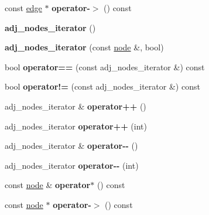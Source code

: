 \begin{DoxyCompactItemize}
\mbox{\label{classnode_a71b168f27cc7338906814f6a3ecc176f}} 
const \mbox{\hyperlink{classedge}{edge}} $\ast$ {\bfseries operator-\/$>$} () const
\item 
\mbox{\label{classnode_a392f19ea6dfa344bdf5c4d5a4b25eb8c}} 
{\bfseries adj\+\_\+nodes\+\_\+iterator} ()
\item 
\mbox{\label{classnode_ade9ca1b2c63a0467be176756545b3c2c}} 
{\bfseries adj\+\_\+nodes\+\_\+iterator} (const \mbox{\hyperlink{classnode}{node}} \&, bool)
\item 
\mbox{\label{classnode_abe20131c7427c6f045ab4c23916efa3c}} 
bool {\bfseries operator==} (const adj\+\_\+nodes\+\_\+iterator \&) const
\item 
\mbox{\label{classnode_abfcd7e8ce1391bd60f155a5de47419c5}} 
bool {\bfseries operator!=} (const adj\+\_\+nodes\+\_\+iterator \&) const
\item 
\mbox{\label{classnode_a5c9569e6719a8bebd6dd78266a0da533}} 
adj\+\_\+nodes\+\_\+iterator \& {\bfseries operator++} ()
\item 
\mbox{\label{classnode_af12ab69bcd07d4d41052b50801690520}} 
adj\+\_\+nodes\+\_\+iterator {\bfseries operator++} (int)
\item 
\mbox{\label{classnode_abd4b60efd003b18db13d9fde0a25f91a}} 
adj\+\_\+nodes\+\_\+iterator \& {\bfseries operator-\/-\/} ()
\item 
\mbox{\label{classnode_ae7cdb2be553782c2dcf48c6ec8ef9d67}} 
adj\+\_\+nodes\+\_\+iterator {\bfseries operator-\/-\/} (int)
\item 
\mbox{\label{classnode_a59fdf9aff393a47b4c60c3f21a4ccbc8}} 
const \mbox{\hyperlink{classnode}{node}} \& {\bfseries operator$\ast$} () const
\item 
\mbox{\label{classnode_a82d46c8753db26b34382fcfd9f887c12}} 
const \mbox{\hyperlink{classnode}{node}} $\ast$ {\bfseries operator-\/$>$} () const
\end{DoxyCompactItemize}
